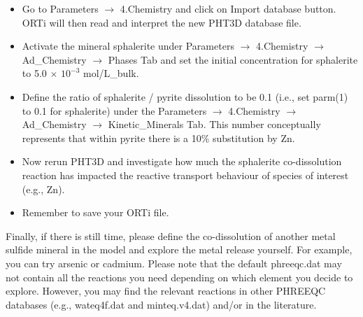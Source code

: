\begin{itemize}

\item Go to {\color{blue}Parameters} $\rightarrow$ {\color{blue}4.Chemistry} and click on {\color{blue}Import database} button. ORTi will then read and interpret the new PHT3D database file.

\item Activate the mineral sphalerite under {\color{blue}Parameters} 
$\rightarrow$ {\color{blue}4.Chemistry} 
$\rightarrow$ {\color{blue}Ad\_Chemistry} 
$\rightarrow$ {\color{blue}Phases} Tab and set the initial concentration 
for sphalerite to 5.0 $\times$ $10^{-3}$ mol/L\_bulk.

\item Define the ratio of sphalerite / pyrite dissolution to be 0.1 (i.e., set parm(1) to 0.1 
for sphalerite) under the {\color{blue}Parameters} 
$\rightarrow$ {\color{blue}4.Chemistry} 
$\rightarrow$ {\color{blue}Ad\_Chemistry} 
$\rightarrow$ {\color{blue}Kinetic\_Minerals} Tab. 
This number conceptually represents that within pyrite there is a 10\% substitution by Zn. 

\item Now rerun PHT3D and investigate how much the sphalerite co-dissolution reaction has impacted the reactive transport behaviour of species of interest (e.g., Zn).

\item Remember to save your ORTi file.

\end{itemize}

Finally, if there is still time, please define the co-dissolution of another metal 
sulfide mineral in the model and explore the metal release yourself. 
For example, you can try arsenic or cadmium. 
Please note that the default phreeqc.dat may not contain all the reactions 
you need depending on which element you decide to explore. 
However, you may find the relevant reactions in other PHREEQC databases 
(e.g., wateq4f.dat and minteq.v4.dat) and/or in the literature. 


